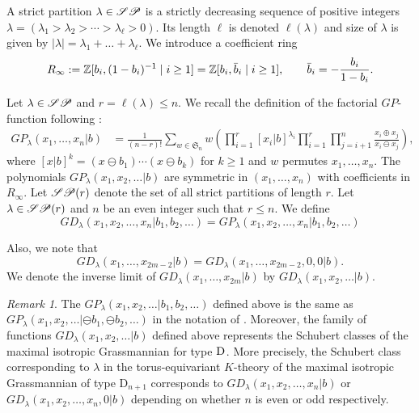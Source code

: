 \documentclass[a4paper]{amsart}
\theoremstyle{remark}
\newtheorem{remark}[thm]{Remark}
\numberwithin{equation}{section}
\begin{document}
A strict partition $\lambda\in \mathscr{SP}$ is a strictly decreasing sequence of positive integers
$\lambda=(\lambda_1>\lambda_2>\dotsm>\lambda_\ell> 0)$. Its length $\ell$ is denoted $\ell(\lambda)$ and size of $\lambda$ is given by $|\lambda|=\lambda_1+\dots+\lambda_{\ell}$. We introduce a coefficient ring \[
R_\infty
:=\mathbb{Z}[b_i,(1-b_i)^{-1}\mid i\ge1]
=\mathbb{Z}[b_i,\bar b_i\mid i\ge1],
\qquad
\bar b_i=-\frac{b_i}{1-b_i}.
\]







Let $\lambda\in \mathscr{SP}$ and $ r=\ell(\lambda)\leq n.$ We recall the definition of the factorial $GP$-function following \cite{IN}: 
\begin{align*}
GP_\lambda(x_1,\ldots,x_n| b)&=
    \frac{1}{(n-r)!}
    \sum_{w\in \mathfrak{S}_n}
    w\left(
\prod_{i=1}^r[x_i| b]^{\lambda_i}
    \prod_{i=1}^r \prod_{j=i+1}^n 
    \frac{x_i\oplus x_j}{x_i\ominus x_j}
    \right),
\end{align*}    
where $[x| b]^k=(x\ominus b_1)\cdots (x\ominus b_{k})$ for $k\geq 1$ and $w$ permutes $x_1,\ldots,x_n$. The polynomials $GP_\lambda(x_1,x_2,\dots | b)$ are symmetric in $(x_1,\ldots,x_n)$ with coefficients in $R_\infty$. Let $\mathscr{SP}(r)$ denote the set of all strict partitions of length $r$. Let $\lambda\in \mathscr{SP}(r)$ and $n$ be an even integer such that $r\leq n$. We define 
\[GD_\lambda(x_1,x_2,\dots,x_{n}| b_1,b_2,\dots)=
    GP_\lambda(x_1,x_2,\dots, x_{n}| b_1,b_2,\dots) 
\]

Also, we note that $$GD_\lambda(x_1,\dots,x_{2m-2}| b)=GD_\lambda(x_1,\dots,x_{2m-2},0,0| b).$$ 
We denote the inverse limit of $GD_\lambda(x_1,\dots,x_{2m}| b)$ by $GD_\lambda(x_1,x_2,\dots| b)$. 


\begin{remark}
The $GP_\lambda(x_1,x_2,\dots| b_1,b_2,\dots )$ defined above is the same as $GP_\lambda(x_1,x_2,\dots| \ominus b_1,\ominus b_2, \dots)$ in the notation of \cite{IN}. Moreover, the family of functions $GD_\lambda(x_1,x_2,\dots| b)$ defined above represents the Schubert classes of the maximal isotropic Grassmannian for type $\mathrm{D}_{}$. More precisely, the Schubert class corresponding to $\lambda$ in the torus-equivariant $K$-theory of the maximal isotropic Grassmannian of type $\mathrm{D}_{n+1}$ corresponds to $GD_\lambda(x_1,x_2,\dots,x_n| b)$ or $GD_\lambda(x_1,x_2,\dots,x_{n},0| b)$ depending on whether $n$ is even or odd respectively. 
\end{remark} 
\end{document}

